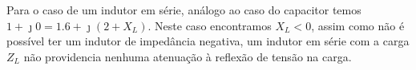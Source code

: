 \begin{enumerate}[1.]
Para o caso de um indutor em série, análogo ao caso do capacitor temos $1 + \jmath 0 = 1.6 + \jmath (2 + X_{L})$. Neste caso encontramos $X_{L} < 0$, assim como não é possível ter um indutor de impedância negativa, um indutor em série com a carga $Z_{L}$ não providencia nenhuma atenuação à reflexão de tensão na carga.

\end{enumerate}
